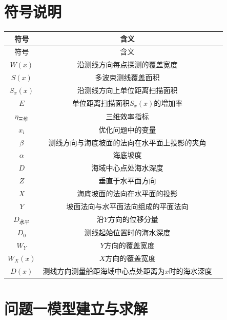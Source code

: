 \documentclass[withoutpreface,bwprint]{cumcmthesis} %
\begin{document}
    \section{符号说明}
    \begin{longtable}{c c m{\textwidth}} %
      \rowcolor{white}  
      \toprule[2pt] %
        符号 & 含义 \\
        \midrule[1pt] %
        \endfirsthead %
        符号 & 含义 \\
        \midrule[1pt]
        \endhead %
        $W(x)$ & 沿测线方向每点探测的覆盖宽度 \\
        $S(x)$ & 多波束测线覆盖面积 \\
        $S_x(x)$ & 沿测线方向上单位距离扫描面积 \\
        $E$ & 单位距离扫描面积$S_x(x)$的增加率 \\
        $\eta_{\text{三维}}$ & 三维效率指标 \\
        $x_i$ & 优化问题中的变量 \\
        $\beta$ & 测线方向与海底坡面的法向在水平面上投影的夹角 \\
        $\alpha$ & 海底坡度 \\
        $D$ & 海域中心点处海水深度 \\
        $Z$ & 垂直于水平面方向 \\
        $X$ & 海底坡面的法向在水平面的投影 \\
        $Y$ & 坡面法向与水平面法向组成的平面法向 \\
        $D_\text{水平}$ & 沿$Y$方向的位移分量 \\
        $D_0$ & 测线起始位置时的海水深度 \\
        $W_Y$ & $Y$方向的覆盖宽度 \\
        $W_X(x)$ & $X$方向的覆盖宽度 \\
        $D(x)$ & 测线方向测量船距海域中心点处距离为$x$时的海水深度 \\
        \bottomrule[2pt] %
    \end{longtable}
     
    \section{问题一模型建立与求解}
\end{document}

